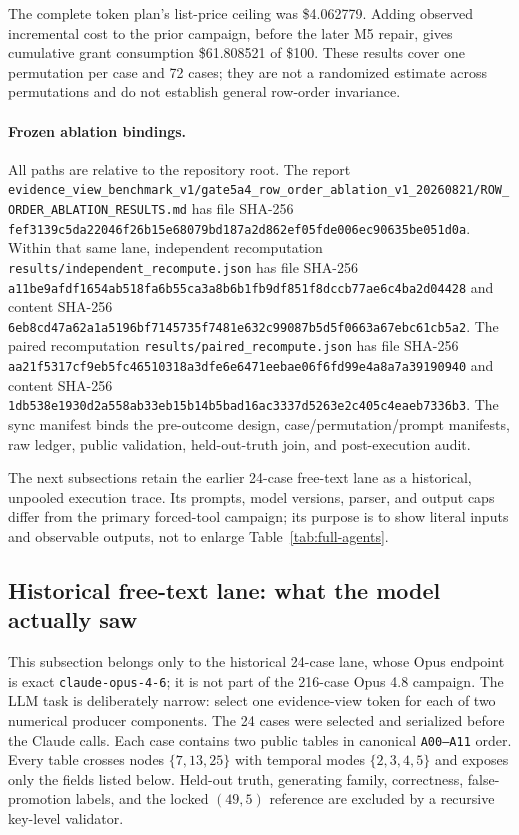 \documentclass{article}
\begin{document}
The complete token plan's list-price ceiling was \$4.062779. Adding observed incremental cost to
the prior campaign, before the later M5 repair, gives cumulative grant consumption \$61.808521 of
\$100. These results cover
one permutation per case and 72 cases; they are not a randomized estimate across permutations and
do not establish general row-order invariance.

\paragraph{Frozen ablation bindings.}
All paths are relative to the repository root. The report
\nolinkurl{evidence_view_benchmark_v1/gate5a4_row_order_ablation_v1_20260821/ROW_ORDER_ABLATION_RESULTS.md}
has file SHA-256
\nolinkurl{fef3139c5da22046f26b15e68079bd187a2d862ef05fde006ec90635be051d0a}.
Within that same lane, independent recomputation
\nolinkurl{results/independent_recompute.json} has file SHA-256
\nolinkurl{a11be9afdf1654ab518fa6b55ca3a8b6b1fb9df851f8dccb77ae6c4ba2d04428}
and content SHA-256
\nolinkurl{6eb8cd47a62a1a5196bf7145735f7481e632c99087b5d5f0663a67ebc61cb5a2}.
The paired recomputation \nolinkurl{results/paired_recompute.json} has file SHA-256
\nolinkurl{aa21f5317cf9eb5fc46510318a3dfe6e6471eebae06f6fd99e4a8a7a39190940}
and content SHA-256
\nolinkurl{1db538e1930d2a558ab33eb15b14b5bad16ac3337d5263e2c405c4eaeb7336b3}.
The sync manifest binds the pre-outcome design, case/permutation/prompt manifests, raw ledger,
public validation, held-out-truth join, and post-execution audit.

The next subsections retain the earlier 24-case free-text lane as a historical, unpooled execution
trace. Its prompts, model versions, parser, and output caps differ from the primary forced-tool
campaign; its purpose is to show literal inputs and observable outputs, not to enlarge Table~\ref{tab:full-agents}.

\subsection{Historical free-text lane: what the model actually saw}
This subsection belongs only to the historical 24-case lane, whose Opus endpoint is exact
\texttt{claude-opus-4-6}; it is not part of the 216-case Opus 4.8 campaign.
The LLM task is deliberately narrow: select one evidence-view token for each of two numerical
producer components. The 24 cases were selected and serialized before the Claude calls. Each case
contains two public tables in canonical \texttt{A00--A11} order. Every table crosses nodes
$\{7,13,25\}$ with temporal modes $\{2,3,4,5\}$ and exposes only the fields listed below.
Held-out truth, generating family, correctness, false-promotion labels, and the locked $(49,5)$
reference are excluded by a recursive key-level validator.
\end{document}
